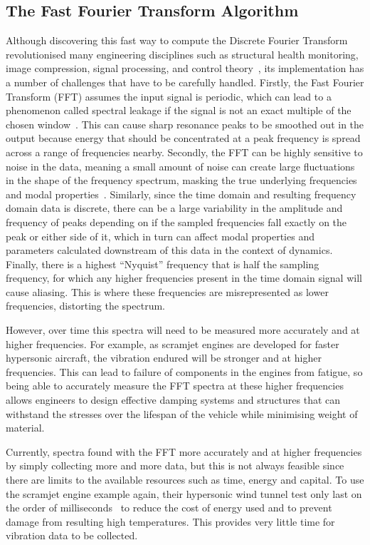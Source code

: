 \documentclass[12pt]{article}
\begin{document}
    \subsection{The Fast Fourier Transform Algorithm}
    Although discovering this fast way to compute the Discrete Fourier Transform revolutionised many engineering disciplines such as structural health monitoring, image compression, signal processing, and control theory~\cite{Byjus2023}, its implementation has a number of challenges that have to be carefully handled.
    Firstly, the Fast Fourier Transform (FFT) assumes the input signal is periodic, which can lead to a phenomenon called spectral leakage if the signal is not an exact multiple of the chosen window~\cite{MathStackExchange2023}.
    This can cause sharp resonance peaks to be smoothed out in the output because energy that should be concentrated at a peak frequency is spread across a range of frequencies nearby.
    Secondly, the FFT can be highly sensitive to noise in the data, meaning a small amount of noise can create large fluctuations in the shape of the frequency spectrum, masking the true underlying frequencies and modal properties~\cite{MathStackExchange2023}.
    Similarly, since the time domain and resulting frequency domain data is discrete, there can be a large variability in the amplitude and frequency of peaks depending on if the sampled frequencies fall exactly on the peak or either side of it, which in turn can affect modal properties and parameters calculated downstream of this data in the context of dynamics.
    Finally, there is a highest ``Nyquist'' frequency that is half the sampling frequency, for which any higher frequencies present in the time domain signal will cause aliasing.
    This is where these frequencies are misrepresented as lower frequencies, distorting the spectrum.

    However, over time this spectra will need to be measured more accurately and at higher frequencies.
    For example, as scramjet engines are developed for faster hypersonic aircraft, the vibration endured will be stronger and at higher frequencies.
    This can lead to failure of components in the engines from fatigue, so being able to accurately measure the FFT spectra at these higher frequencies allows engineers to design effective damping systems and structures that can withstand the stresses over the lifespan of the vehicle while minimising weight of material.

    Currently, spectra found with the FFT more accurately and at higher frequencies by simply collecting more and more data, but this is not always feasible since there are limits to the available resources such as time, energy and capital.
    To use the scramjet engine example again, their hypersonic wind tunnel test only last on the order of milliseconds~\cite{Mec463} to reduce the cost of energy used and  to prevent damage from resulting high temperatures.
    This provides very little time for vibration data to be collected.
\end{document}
